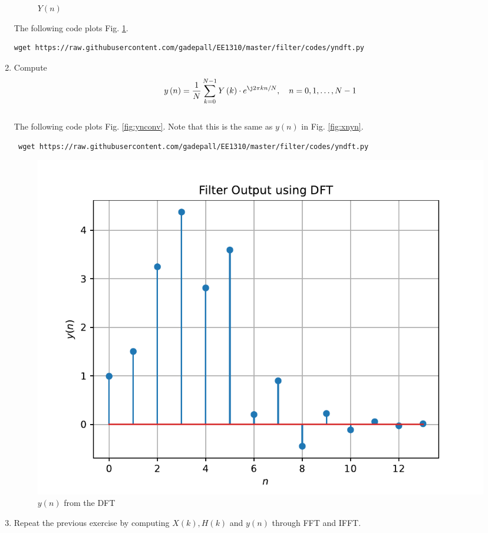 \documentclass[journal,12pt,twocolumn]{IEEEtran}
\renewcommand\thesection{\arabic{section}}
\begin{document}
\begin{enumerate}[label=\thesection.\arabic*]
\begin{figure}[!ht]
  \caption{$Y(n)$}
  \label{fig:Y(n)}
  \end{figure}
  The following code plots Fig. \ref{fig:Y(n)}.
%
\begin{lstlisting}
wget https://raw.githubusercontent.com/gadepall/EE1310/master/filter/codes/yndft.py
\end{lstlisting}
\item Compute
\begin{equation}
  y\brak{n}={\frac {1}{N}}\sum _{k=0}^{N-1}Y\brak{k}\cdot e^{\j 2\pi kn/N},\quad n = 0,1,\dots, N-1
  \label{eq:inv-ft}
 \end{equation}
 \\
 \solution The following code plots Fig. \ref{fig:ynconv}. Note that this is the same as 
 $y(n)$ in  Fig. 
 \ref{fig:xnyn}. 
 \begin{lstlisting}
 wget https://raw.githubusercontent.com/gadepall/EE1310/master/filter/codes/yndft.py
 \end{lstlisting}
 \begin{figure}[!ht]
 \centering
 \includegraphics[width=\columnwidth]{./figs/yndft}
 \caption{$y(n)$ from the DFT}
 \label{fig:yndft}
 \end{figure}
 \item Repeat the previous exercise by computing $X(k), H(k)$ and $y(n)$ through FFT and 
 IFFT.\\
 \solution
 \begin{figure}[!ht]
  \centering

\end{figure}
\end{enumerate}
\end{document}
